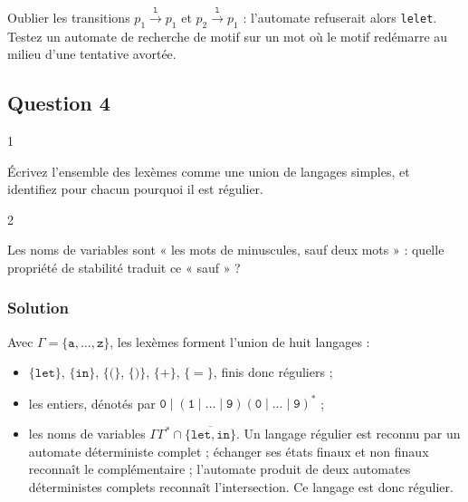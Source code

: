 \documentclass[11pt,a4paper]{article}
\providecommand{\tightlist}{\setlength{\itemsep}{0pt}\setlength{\parskip}{0pt}}
\begin{document}
\begin{piege}

Oublier les transitions \(p_1 \xrightarrow{\texttt l} p_1\) et \(p_2 \xrightarrow{\texttt l} p_1\) : l'automate refuserait alors \texttt{lelet}. Testez un automate de recherche de motif sur un mot où le motif redémarre au milieu d'une tentative avortée.

\end{piege}

\hypertarget{question-4}{%
\subsection{Question 4}\label{question-4}}

\begin{indication}{1}

Écrivez l'ensemble des lexèmes comme une union de langages simples, et identifiez pour chacun pourquoi il est régulier.

\end{indication}

\begin{indication}{2}

Les noms de variables sont « les mots de minuscules, sauf deux mots » : quelle propriété de stabilité traduit ce « sauf » ?

\end{indication}

\hypertarget{solution-3}{%
\subsubsection{Solution}\label{solution-3}}

Avec \(\Gamma = \{\texttt a, \dots, \texttt z\}\), les lexèmes forment l'union de huit langages :

\begin{itemize}
\tightlist
\item
  \(\{\texttt{let}\}\), \(\{\texttt{in}\}\), \(\{\texttt (\}\), \(\{\texttt )\}\), \(\{\texttt +\}\), \(\{\texttt =\}\), finis donc réguliers ;
\item
  les entiers, dénotés par \(\texttt 0 \mid (\texttt 1 \mid \dots \mid \texttt 9)(\texttt 0 \mid \dots \mid \texttt 9)^*\) ;
\item
  les noms de variables \(\Gamma\Gamma^* \cap \overline{\{\texttt{let}, \texttt{in}\}}\). Un langage régulier est reconnu par un automate déterministe complet ; échanger ses états finaux et non finaux reconnaît le complémentaire ; l'automate produit de deux automates déterministes complets reconnaît l'intersection. Ce langage est donc régulier.
\end{itemize}
\end{document}
